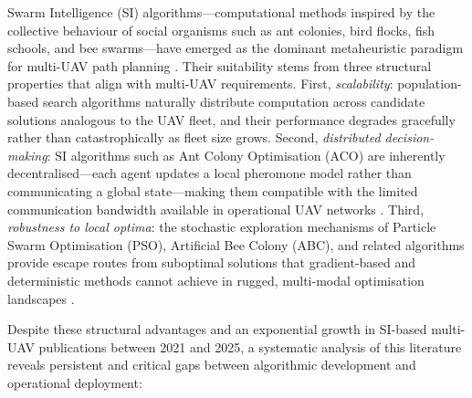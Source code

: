 \documentclass[review,3p,times]{elsarticle}
\begin{document}
Swarm Intelligence (SI) algorithms---computational methods inspired by the collective behaviour of social organisms such as ant colonies, bird flocks, fish schools, and bee swarms---have emerged as the dominant metaheuristic paradigm for multi-UAV path planning \cite{dorigo2006,kennedy1995,blum2008,yang2010,beni2005,bonabeau1999,yang2013}. Their suitability stems from three structural properties that align with multi-UAV requirements. First, \textit{scalability}: population-based search algorithms naturally distribute computation across candidate solutions analogous to the UAV fleet, and their performance degrades gracefully rather than catastrophically as fleet size grows. Second, \textit{distributed decision-making}: SI algorithms such as Ant Colony Optimisation (ACO) are inherently decentralised---each agent updates a local pheromone model rather than communicating a global state---making them compatible with the limited communication bandwidth available in operational UAV networks \cite{dorigo2006,hayat2016}. Third, \textit{robustness to local optima}: the stochastic exploration mechanisms of Particle Swarm Optimisation (PSO), Artificial Bee Colony (ABC), and related algorithms provide escape routes from suboptimal solutions that gradient-based and deterministic methods cannot achieve in rugged, multi-modal optimisation landscapes \cite{kennedy1995,blum2008}.

Despite these structural advantages and an exponential growth in SI-based multi-UAV publications between 2021 and 2025, a systematic analysis of this literature reveals persistent and critical gaps between algorithmic development and operational deployment:
\end{document}
